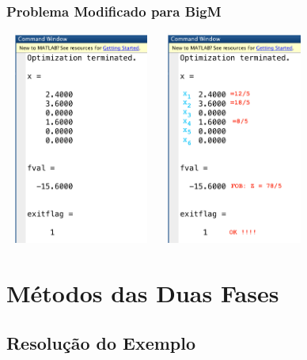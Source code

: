 \documentclass{beamer}
\begin{document}
\begin{frame}
	\frametitle{Problema Modificado para BigM}

		\centering
		{
			\includegraphics[width=5cm,height=7cm]{BigM_Matlab_3.png}
		}
		\only<2>
		{
			\includegraphics[width=5cm,height=7cm]{BigM_Matlab_4.png}
		}
\end{frame}


\section{Métodos das Duas Fases}
\subsection{Resolução do Exemplo}
\end{document}
